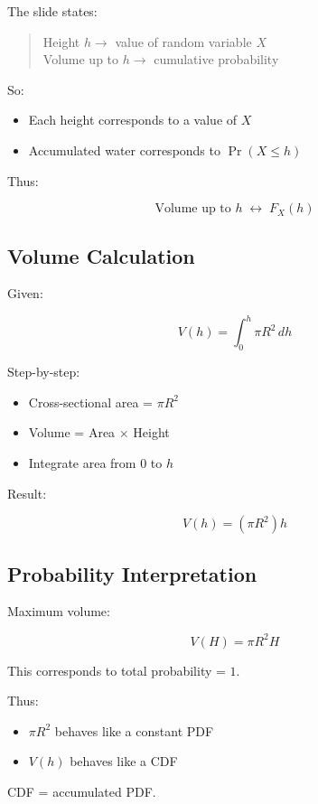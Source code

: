 \documentclass[12pt]{article}
\begin{document}
The slide states:

\begin{quote}
Height $h \rightarrow$ value of random variable $X$\\
Volume up to $h \rightarrow$ cumulative probability
\end{quote}

So:

\begin{itemize}
\item Each height corresponds to a value of $X$
\item Accumulated water corresponds to $\Pr(X \le h)$
\end{itemize}

Thus:

\[
\text{Volume up to } h \;\longleftrightarrow\; F_X(h)
\]

\subsection*{Volume Calculation}

Given:

\[
V(h) = \int_{0}^{h} \pi R^2 \, dh
\]

Step-by-step:

\begin{itemize}
\item Cross-sectional area = $\pi R^2$
\item Volume = Area $\times$ Height
\item Integrate area from $0$ to $h$
\end{itemize}

Result:

\[
V(h) = (\pi R^2)h
\]

\subsection*{Probability Interpretation}

Maximum volume:

\[
V(H) = \pi R^2 H
\]

This corresponds to total probability = $1$.

Thus:

\begin{itemize}
\item $\pi R^2$ behaves like a constant PDF
\item $V(h)$ behaves like a CDF
\end{itemize}

CDF = accumulated PDF.
\end{document}
